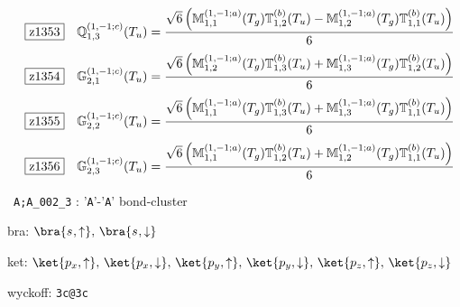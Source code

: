 \documentclass[fleqn,10pt,landscape]{jsarticle}
\begin{document}
\begin{dmath*}
\hspace*{3mm}\fbox{z1353}\quad \mathbb{Q}_{1,3}^{(1,-1;c)}(T_{u})=\frac{\sqrt{6} \left(\mathbb{M}_{1,1}^{(1,-1;a)}(T_{g}) \mathbb{T}_{1,2}^{(b)}(T_{u}) - \mathbb{M}_{1,2}^{(1,-1;a)}(T_{g}) \mathbb{T}_{1,1}^{(b)}(T_{u})\right)}{6}
\end{dmath*}
\begin{dmath*}
\hspace*{3mm}\fbox{z1354}\quad \mathbb{G}_{2,1}^{(1,-1;c)}(T_{u})=\frac{\sqrt{6} \left(\mathbb{M}_{1,2}^{(1,-1;a)}(T_{g}) \mathbb{T}_{1,3}^{(b)}(T_{u}) + \mathbb{M}_{1,3}^{(1,-1;a)}(T_{g}) \mathbb{T}_{1,2}^{(b)}(T_{u})\right)}{6}
\end{dmath*}
\begin{dmath*}
\hspace*{3mm}\fbox{z1355}\quad \mathbb{G}_{2,2}^{(1,-1;c)}(T_{u})=\frac{\sqrt{6} \left(\mathbb{M}_{1,1}^{(1,-1;a)}(T_{g}) \mathbb{T}_{1,3}^{(b)}(T_{u}) + \mathbb{M}_{1,3}^{(1,-1;a)}(T_{g}) \mathbb{T}_{1,1}^{(b)}(T_{u})\right)}{6}
\end{dmath*}
\begin{dmath*}
\hspace*{3mm}\fbox{z1356}\quad \mathbb{G}_{2,3}^{(1,-1;c)}(T_{u})=\frac{\sqrt{6} \left(\mathbb{M}_{1,1}^{(1,-1;a)}(T_{g}) \mathbb{T}_{1,2}^{(b)}(T_{u}) + \mathbb{M}_{1,2}^{(1,-1;a)}(T_{g}) \mathbb{T}_{1,1}^{(b)}(T_{u})\right)}{6}
\end{dmath*}
\vspace{5mm}

\noindent\textbullet\, \texttt{A;A_002_3} : '\texttt{A}'-'\texttt{A}' bond-cluster

\noindent\quad * bra: $\bra{s_{},\uparrow},\, \bra{s_{},\downarrow}$

\noindent\quad * ket: $\ket{p_{x},\uparrow},\, \ket{p_{x},\downarrow},\, \ket{p_{y},\uparrow},\, \ket{p_{y},\downarrow},\, \ket{p_{z},\uparrow},\, \ket{p_{z},\downarrow}$

\noindent\quad * wyckoff: \texttt{3c@3c}
\end{document}
